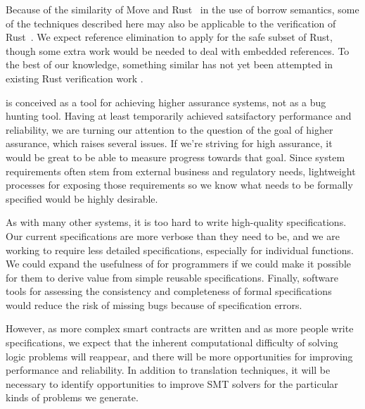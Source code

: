 Because of the similarity of Move and Rust~\cite{rust} in the use of borrow
semantics, some of the techniques described here may also be applicable to the
verification of Rust~\cite{rust}.  We expect reference elimination to apply for
the safe subset of Rust, though some extra work would be needed to deal with
embedded references.  To the best of our knowledge, something similar has not
yet been attempted in existing Rust verification work
\cite{prusti,smack,nopanic,crust}.



\MVP is conceived as a tool for achieving higher assurance systems, not as a bug
hunting tool. Having at least temporarily achieved satsifactory performance and
reliability, we are turning our attention to the question of the goal of higher
assurance, which raises several issues.  If we're striving for high assurance,
it would be great to be able to measure progress towards that goal.  Since
system requirements often stem from external business and regulatory needs,
lightweight processes for exposing those requirements so we know what needs to
be formally specified would be highly desirable.

As with many other systems, it is too hard to write high-quality specifications.
Our current specifications are more verbose than they need to be, and we are
working to require less detailed specifications, especially for individual
functions.  We could expand the usefulness of \MVP for programmers if we could
make it possible for them to derive value from simple reusable specifications.
Finally, software tools for assessing the consistency and completeness of formal
specifications would reduce the risk of missing bugs because of specification
errors.

However, as more complex smart contracts are written and as more people write
specifications, we expect that the inherent computational difficulty of solving
logic problems will reappear, and there will be more opportunities for improving
performance and reliability.  In addition to translation techniques, it will be
necessary to identify opportunities to improve SMT solvers for the particular
kinds of problems we generate.


